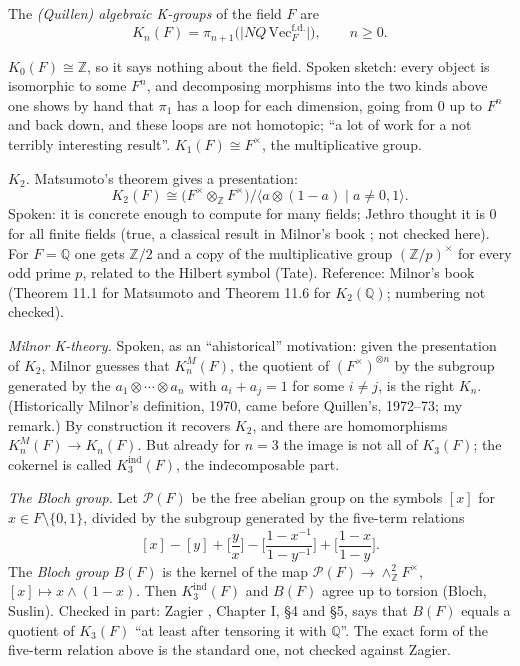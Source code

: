 \begin{definition}
\label{definition-quillen-k-groups}
The \textit{(Quillen) algebraic K-groups} of
the field $F$ are
$$
K_n(F)=\pi_{n+1}\big(\big|NQ\,
\mathrm{Vec}_F^{\mathrm{f.d.}}\big|\big),
\qquad n\geq 0.
$$
\end{definition}

\noindent
$K_0(F)\cong\mathbb{Z}$, so it says nothing
about the field. Spoken sketch: every object
is isomorphic to some $F^n$, and decomposing
morphisms into the two kinds above one shows
by hand that $\pi_1$ has a loop for each
dimension, going from $0$ up to $F^n$ and
back
down, and these loops are not homotopic; ``a
lot of work for a not terribly interesting
result''. $K_1(F)\cong F^{\times}$, the
multiplicative group.

\textit{$K_2$.} Matsumoto's theorem gives a
presentation:
$$
K_2(F)\cong
\big(F^\times\otimes_{\mathbb{Z}}
 F^\times\big)
/\big\langle a\otimes(1-a)
\mid a\neq 0,1\big\rangle.
$$
Spoken: it is concrete enough to compute
for many fields; Jethro thought it is $0$
for all finite fields (true, a classical
result in Milnor's book \cite{milnor-k};
not checked here). For $F=\mathbb{Q}$ one
gets $\mathbb{Z}/2$
and a copy of the multiplicative group
$(\mathbb{Z}/p)^\times$ for every odd prime
$p$, related to the Hilbert symbol (Tate).
Reference: Milnor's book \cite{milnor-k}
(Theorem 11.1 for Matsumoto and Theorem 11.6
for $K_2(\mathbb{Q})$; numbering not
checked).

\textit{Milnor K-theory.} Spoken, as an
``ahistorical'' motivation: given the
presentation of $K_2$, Milnor guesses that
$K_n^M(F)$, the quotient of
$(F^\times)^{\otimes n}$ by the subgroup
generated by the $a_1\otimes\cdots\otimes
a_n$ with $a_i+a_j=1$ for some $i\neq j$, is
the right $K_n$. (Historically Milnor's
definition, 1970, came before Quillen's,
1972--73; my remark.) By construction it
recovers $K_2$, and there are homomorphisms
$K_n^M(F)\to K_n(F)$. But already for $n=3$
the image is not all of $K_3(F)$; the
cokernel is called $K_3^{\mathrm{ind}}(F)$,
the indecomposable part.

\textit{The Bloch group.} Let
$\mathcal{P}(F)$ be the free abelian group on
the symbols $[x]$ for
$x\in F\setminus\{0,1\}$, divided by the
subgroup generated by the five-term
relations
$$
[x]-[y]+\Big[\frac{y}{x}\Big]
-\Big[\frac{1-x^{-1}}{1-y^{-1}}\Big]
+\Big[\frac{1-x}{1-y}\Big].
$$
The \textit{Bloch group} $B(F)$ is the
kernel of the map
$\mathcal{P}(F)\to
\wedge^2_{\mathbb{Z}}F^\times$,
$[x]\mapsto x\wedge(1-x)$. Then
$K_3^{\mathrm{ind}}(F)$ and $B(F)$ agree up
to torsion (Bloch, Suslin). Checked in part:
Zagier \cite{zagier-dilog}, Chapter I, \S 4
and \S 5, says that $B(F)$ equals a quotient
of $K_3(F)$ ``at least after tensoring it
with $\mathbb{Q}$''. The exact form of the
five-term relation above is the standard one,
not checked against Zagier.

